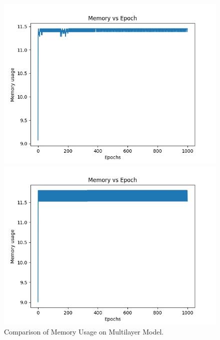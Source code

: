 \documentclass{cup-ino}
\begin{document}
\begin{figure}[h!]
\begin{minipage}{0.47\textwidth}
\includegraphics[width=\linewidth]{images/multi_gen_mem.jpeg}
\end{minipage}
\hfill
\begin{minipage}{0.47\textwidth}
\includegraphics[width=\linewidth]{images/multi_grad_mem.jpeg}
\end{minipage}

\caption{Comparison of Memory Usage on Multilayer Model.}
\label{fig:multimem}
\end{figure}
\end{document}
